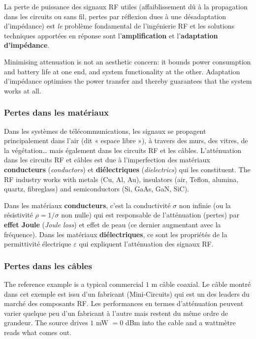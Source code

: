 \begin{definition}
  La perte de puissance des signaux RF utiles (affaiblissement dû à la
  propagation dans les circuits ou sans fil, pertes par réflexion dues à une
  désadaptation d'impédance) est \textit{le} problème fondamental de
  l'ingénierie RF et les solutions techniques apportées en réponse sont
  l'\textbf{amplification} et l'\textbf{adaptation d'impédance}.
\end{definition}

Minimising attenuation is not an aesthetic concern: it bounds power
consumption and battery life at one end, and system functionality at the other.
Adaptation d'impédance optimises the power transfer and thereby guarantees that
the system works at all.

\subsubsection{Pertes dans les matériaux}
Dans les systèmes de télécommunications, les signaux se propagent
principalement dans l'air (dit « espace libre »), à travers des murs, des
vitres, de la végétation… mais également dans les circuits RF et les câbles.
L'atténuation dans les circuits RF et câbles est due à l'imperfection des
matériaux \textbf{conducteurs} (\textit{conductors}) et \textbf{diélectriques}
(\textit{dielectrics}) qui les constituent. The RF industry works
with metals (Cu, Al, Au), insulators (air, Teflon, alumina, quartz, fibreglass)
and semiconductors (Si, GaAs, GaN, SiC).

\begin{definition}
  Dans les matériaux \textbf{conducteurs}, c'est la conductivité $\sigma$ non
  infinie (ou la résistivité $\rho = 1/\sigma$ non nulle) qui est responsable
  de l'atténuation (pertes) par \textbf{effet Joule} (\textit{Joule loss}) et
  effet de peau (ce dernier augmentant avec la fréquence). Dans les matériaux
  \textbf{diélectriques}, ce sont les propriétés de la permittivité électrique
  $\varepsilon$ qui expliquent l'atténuation des signaux RF.
\end{definition}

\subsubsection{Pertes dans les câbles}
The reference example is a typical commercial $1$ m câble coaxial. Le câble
montré dans cet exemple est issu d'un fabricant (Mini-Circuits) qui est un des
leaders du marché des composants RF. Les performances en termes d'atténuation
peuvent varier quelque peu d'un fabricant à l'autre mais restent du même ordre
de grandeur. The source drives $1$ mW $=0$ dBm into the cable and a wattmètre
reads what comes out.

